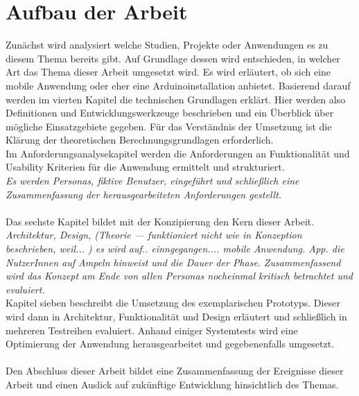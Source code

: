 \section{Aufbau der Arbeit}
Zunächst wird analysiert welche Studien, Projekte oder Anwendungen es zu diesem Thema bereits gibt. Auf Grundlage dessen wird entschieden, in welcher Art das Thema dieser Arbeit umgesetzt wird. Es wird erläutert, ob sich eine mobile Anwendung oder eher eine \gls{Arduino}installation anbietet. Basierend darauf werden im vierten Kapitel die technischen Grundlagen erklärt. Hier werden also Definitionen und Entwicklungswerkzeuge beschrieben und ein Überblick über mögliche Einsatzgebiete gegeben. Für das Verständnis der Umsetzung ist die Klärung der theoretischen Berechnungsgrundlagen erforderlich. \\
Im Anforderungsanalysekapitel werden die Anforderungen an Funktionalität und Usability Kriterien für die Anwendung ermittelt und strukturiert. \\
\textit{Es werden Personas, fiktive Benutzer, eingeführt und schließlich eine Zusammenfassung der herausgearbeiteten Anforderungen gestellt.}\\\\ 
Das sechste Kapitel bildet mit der Konzipierung den Kern dieser Arbeit. 
\textit{Architektur, Design, (Theorie --- funktioniert nicht wie in Konzeption beschrieben, weil... )
es wird auf.. einngegangen.... mobile Anwendung. \gls{App}. die NutzerInnen auf Ampeln hinweist und die Dauer der Phase. }
\textit{Zusammenfassend wird das Konzept am Ende von allen Personas nocheinmal kritisch betrachtet und evaluiert.}\\
Kapitel sieben beschreibt die Umsetzung des exemplarischen Prototyps. Dieser wird dann in Architektur, Funktionalität und Design erläutert und schließlich in mehreren Testreihen evaluiert. Anhand einiger Systemtests wird eine Optimierung der Anwendung herausgearbeitet und gegebenenfalls umgesetzt. 
\\\\Den Abschluss dieser Arbeit bildet eine Zusammenfassung der Ereignisse dieser Arbeit und einen Auslick auf zukünftige Entwicklung hinsichtlich des Themas.
